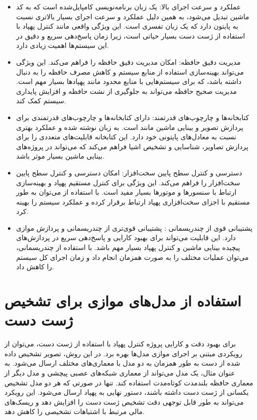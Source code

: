 \begin{itemize}
    \item عملکرد و سرعت اجرای بالا:  یک زبان برنامه‌نویسی کامپایل‌شده است که به کد ماشین تبدیل می‌شود، به همین دلیل عملکرد و سرعت اجرای بسیار بالاتری نسبت به پایتون دارد که یک زبان تفسری است. این ویژگی
    واقعی مانند کنترل پهپاد با استفاده از ژست دست بسیار حیاتی است، زیرا زمان پاسخ‌دهی سریع و دقیق در این سیستم‌ها اهمیت زیادی دارد.
    \item مدیریت دقیق حافظه:  امکان مدیریت دقیق حافظه را فراهم می‌کند. این ویژگی می‌تواند بهینه‌سازی استفاده از منابع سیستم و کاهش مصرف حافظه را به دنبال داشته باشد، که برای سیستم‌هایی 
    با منابع محدود مانند پهپادها بسیار مهم است. مدیریت صحیح حافظه می‌تواند به جلوگیری از نشت حافظه و افزایش پایداری سیستم کمک کند.
    \item کتابخانه‌ها و چارچوب‌های قدرتمند:  دارای کتابخانه‌ها و چارچوب‌های قدرتمندی برای پردازش تصویر و بینایی ماشین مانند  است.  به زبان  نوشته شده
    و عملکرد بهتری نسبت به معادل‌های پایتونی خود دارد. این کتابخانه قابلیت‌های متعددی را برای پردازش تصاویر، شناسایی و تشخیص اشیا فراهم می‌کند که می‌تواند در پروژه‌های بینایی ماشین بسیار موثر باشد.
    \item دسترسی و کنترل سطح پایین سخت‌افزار:  امکان دسترسی و کنترل سطح پایین سخت‌افزار را فراهم می‌کند. این ویژگی برای کنترل مستقیم پهپاد و بهینه‌سازی ارتباط با سنسورها 
    و موتورها بسیار مفید است. با استفاده از  می‌توان به طور مستقیم با اجزای سخت‌افزاری پهپاد ارتباط برقرار کرده و عملکرد سیستم را بهینه کرد.
    \item  پشتیبانی قوی از چندریسمانی :  پشتیبانی قوی‌تری از چندریسمانی و پردازش موازی دارد. این قابلیت می‌تواند برای بهبود کارایی و پاسخ‌دهی سریع در پردازش‌های پیچیده بینایی ماشین 
    و کنترل پهپاد بسیار مهم باشد. با استفاده از چندریسمانی، می‌توان عملیات مختلف را به صورت همزمان انجام داد و زمان اجرای کل سیستم را کاهش داد.
\end{itemize}

\section{استفاده از مدل‌های موازی برای تشخیص ژست دست}
برای بهبود دقت و کارایی پروژه کنترل پهپاد با استفاده از ژست دست، می‌توان از رویکردی مبتنی بر اجرای موازی مدل‌ها بهره برد. در این روش، تصویر تشخیص داده شده از دست به طور همزمان به دو مدل با معماری‌های مختلف ارسال 
می‌شود. به عنوان مثال، یک مدل می‌تواند از معماری شبکه‌های عصبی پیچشی  و مدل دیگر از معماری حافظه بلندمدت کوتاه‌مدت  استفاده کند. تنها در صورتی که هر دو مدل تشخیص یکسانی از ژست دست داشته باشند، 
دستور نهایی به پهپاد ارسال می‌شود. این رویکرد می‌تواند به طور قابل توجهی دقت تشخیص ژست دست را افزایش دهد و ریسک‌های مالی مرتبط با اشتباهات تشخیصی را کاهش دهد.

